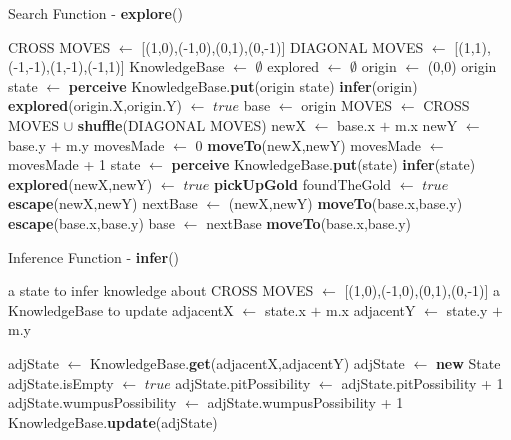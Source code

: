 \documentclass[11pt,a4paper]{article}
\begin{document}
\begin{algorithm}
\caption{Search Function - \textbf{explore}()}
\label{explore}
\begin{algorithmic}[1]
\REQUIRE CROSS MOVES $\leftarrow$ [(1,0),(-1,0),(0,1),(0,-1)]
\REQUIRE DIAGONAL MOVES $\leftarrow$ [(1,1),(-1,-1),(1,-1),(-1,1)]
\STATE KnowledgeBase $\leftarrow$ $\emptyset$
\STATE explored $\leftarrow$ $\emptyset$
\STATE
\STATE origin $\leftarrow$ (0,0)
\STATE origin state $\leftarrow$ \textbf{perceive}
\STATE KnowledgeBase.\textbf{put}(origin state)
\STATE \textbf{infer}(origin)
\STATE \textbf{explored}(origin.X,origin.Y) $\leftarrow$ $true$
\STATE base $\leftarrow$ origin
\STATE
\LOOP
\STATE MOVES $\leftarrow$ CROSS MOVES $\cup$ \textbf{shuffle}(DIAGONAL MOVES)
\STATE newX $\leftarrow$ base.x $+$ m.x 
\STATE newY $\leftarrow$ base.y $+$ m.y
\STATE movesMade $\leftarrow$ 0
\STATE \textbf{moveTo}(newX,newY)
\STATE movesMade $\leftarrow$ movesMade + 1
\STATE state $\leftarrow$ \textbf{perceive}
\STATE KnowledgeBase.\textbf{put}(state)
\STATE \textbf{infer}(state)
\STATE \textbf{explored}(newX,newY) $\leftarrow$ $true$
\STATE \textbf{pickUpGold}
\STATE foundTheGold $\leftarrow$ $true$
\STATE \textbf{escape}(newX,newY)
\ENDIF
{}
\STATE nextBase $\leftarrow$ (newX,newY)
\ENDIF
\STATE \textbf{moveTo}(base.x,base.y)
\ENDIF
\ENDFOR
{}
\STATE \textbf{escape}(base.x,base.y)
\ENDIF
\STATE base $\leftarrow$ nextBase
\STATE \textbf{moveTo}(base.x,base.y)
\ENDLOOP
\end{algorithmic}
\end{algorithm}

\newpage

\begin{algorithm}
\caption{Inference Function - \textbf{infer}()}
\label{infer}
\begin{algorithmic}[1]
\REQUIRE a state to infer knowledge about
\REQUIRE CROSS MOVES $\leftarrow$ [(1,0),(-1,0),(0,1),(0,-1)]
\REQUIRE a KnowledgeBase to update
\STATE adjacentX $\leftarrow$ state.x $+$ m.x 
\STATE adjacentY $\leftarrow$ state.y $+$ m.y

\STATE adjState $\leftarrow$ KnowledgeBase.\textbf{get}(adjacentX,adjacentY)
\ELSE
\STATE adjState $\leftarrow$ \textbf{new} State
\ENDIF
\STATE
{}
\STATE adjState.isEmpty $\leftarrow$ $true$
\ELSE
{}
\STATE adjState.pitPossibility $\leftarrow$ adjState.pitPossibility + 1
\ENDIF
{}
\STATE adjState.wumpusPossibility $\leftarrow$ adjState.wumpusPossibility + 1
\ENDIF
\ENDIF
\STATE KnowledgeBase.\textbf{update}(adjState)
\ENDFOR
\end{algorithmic}
\end{algorithm}
\end{document}
